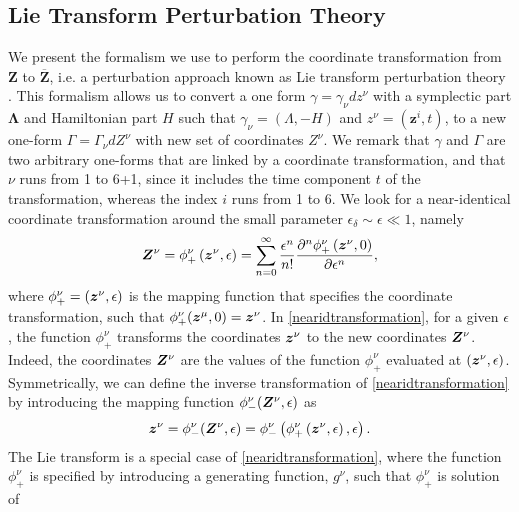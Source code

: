 \subsection{Lie Transform Perturbation Theory}
\label{LieTransformPerturbationTheory}

We present the formalism we use to perform the coordinate transformation from $\mathbf Z$ to $\overline{\mathbf Z}$, i.e. a perturbation approach known as Lie transform perturbation theory \citep{Deprit1969,Cary1981,Littlejohn1981,Brizard2009}.
%
This formalism allows us to convert a one form $\gamma=\gamma_\nu dz^\nu$ with a symplectic part $\mathbf \Lambda$ and Hamiltonian part $H$ such that $\gamma_\nu=(\Lambda,-H)$ and $z^\nu=(\mathbf z^i,t)$, to a new one-form $\Gamma = \Gamma_\nu dZ^\nu$ with new set of coordinates $Z^{\nu}$.
%
We remark that $\gamma$ and $\Gamma$ are two arbitrary one-forms that are linked by a coordinate transformation, and that $\nu$ runs from 1 to 6+1, since it includes the time component $t$ of the transformation, whereas the index $i$ runs from 1 to 6.
%
We look for a near-identical coordinate transformation around the small parameter $\epsilon_\delta \sim \epsilon \ll 1$, namely
%
\begin{equation} \label{nearidtransformation}
\bm{Z}^{\nu} = \phi_+^\nu\left( \bm{z}^\nu, \epsilon\right) = \sum_{n=0}^{\infty}  \frac{\epsilon^n}{n!} \frac{\partial^n  \phi_+^\nu\left( \bm{z}^\nu, 0 \right)  }{\partial \epsilon^n}  ,
\end{equation}
%
where $\phi_{+}^\nu = \left( \bm{z}^\nu, \epsilon\right) $ is the mapping function that specifies the coordinate transformation, such that $\phi_+^\nu(\bm{z}^\mu,0) = \bm{z}^\nu$.
%
In \cref{nearidtransformation}, for a given $\epsilon$, the function $\phi_+^\nu$ transforms the coordinates $\bm{z}^\nu$ to the new coordinates $\bm{Z}^\nu$.
%
Indeed, the coordinates $ \bm{Z}^\nu$ are the values of the function $\phi_+^\nu$ evaluated at $(\bm{z}^\nu,\epsilon)$.
%
Symmetrically, we can define the inverse transformation of \cref{nearidtransformation} by introducing the mapping function $\phi_{-}^\nu( \bm{Z}^\nu, \epsilon) $ as
%
\begin{equation} \label{inversenearidtransformation}
\bm{z}^\nu = \phi_{-}^{\nu}( \bm{Z}^\nu, \epsilon) = \phi_{-}^{\nu}\left(\phi_+^\nu\left( \bm{z}^\nu, \epsilon\right), \epsilon\right).
\end{equation}
%
The Lie transform is a special case of \cref{nearidtransformation}, where the function $\phi_+^\nu$ is specified by introducing a generating function, $g^\nu$, such that $\phi_+^\nu$ is solution of
